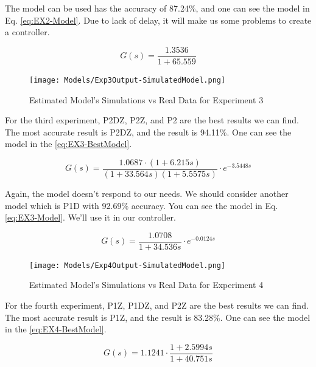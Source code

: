 \documentclass[11pt,a4paper,twocolumn]{article}
\begin{document}
The model can be used has the accuracy of 87.24\%, and one can see the model in Eq. \eqref{eq:EX2-Model}. Due to lack of delay, it will make us some problems to create a controller.

\begin{equation}
    G(s) = \frac{1.3536}{1+65.559}
    \label{eq:EX2-Model}
\end{equation}


\begin{figure}[H]
    \centering
    \texttt{[image: Models/Exp3Output-SimulatedModel.png]}
    \caption{Estimated Model's Simulations vs Real Data for Experiment 3}
\end{figure}

For the third experiment, P2DZ, P2Z, and P2 are the best results we can find. The most accurate result is P2DZ, and the result is 94.11\%. One can see the model in the \eqref{eq:EX3-BestModel}.

\begin{equation}
    G(s) = \frac{1.0687 \cdot (1+6.215s)}{(1+33.564s)(1+5.5575s)} \cdot e^{-3.5448s}
    \label{eq:EX3-BestModel}
\end{equation}

Again, the model doesn't respond to our needs. We should consider another model which is P1D with 92.69\% accuracy. You can see the model in Eq. \eqref{eq:EX3-Model}. We'll use it in our controller.

\begin{equation}
    G(s) = \frac{1.0708}{1+34.536s} \cdot e^{-0.0124s}
    \label{eq:EX3-Model}
\end{equation}


\begin{figure}[H]
    \centering
    \texttt{[image: Models/Exp4Output-SimulatedModel.png]}
    \caption{Estimated Model's Simulations vs Real Data for Experiment 4}
\end{figure}

For the fourth experiment, P1Z, P1DZ, and P2Z are the best results we can find. The most accurate result is P1Z, and the result is 83.28\%. One can see the model in the \eqref{eq:EX4-BestModel}.

\begin{equation}
    G(s) = 1.1241 \cdot \frac{1+2.5994s}{1+40.751s}
    \label{eq:EX4-BestModel}
\end{equation}
\end{document}

